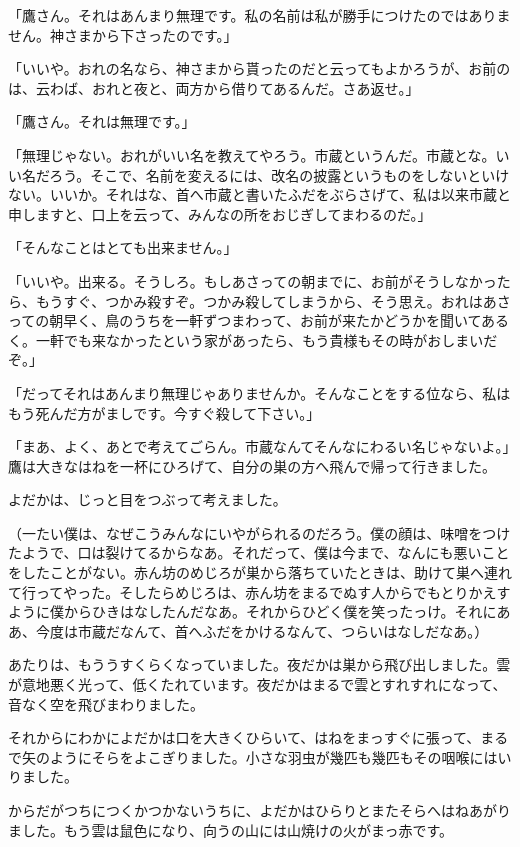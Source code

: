 \documentclass[a4paper, platex, dvipdfmx]{jsarticle}
\begin{document}
「鷹さん。それはあんまり無理です。私の名前は私が勝手につけたのではありません。神さまから下さったのです。」

「いいや。おれの名なら、神さまから貰ったのだと云ってもよかろうが、お前のは、云わば、おれと夜と、両方から借りてあるんだ。さあ返せ。」

「鷹さん。それは無理です。」

「無理じゃない。おれがいい名を教えてやろう。市蔵というんだ。市蔵とな。いい名だろう。そこで、名前を変えるには、改名の披露というものをしないといけない。いいか。それはな、首へ市蔵と書いたふだをぶらさげて、私は以来市蔵と申しますと、口上を云って、みんなの所をおじぎしてまわるのだ。」

「そんなことはとても出来ません。」

「いいや。出来る。そうしろ。もしあさっての朝までに、お前がそうしなかったら、もうすぐ、つかみ殺すぞ。つかみ殺してしまうから、そう思え。おれはあさっての朝早く、鳥のうちを一軒ずつまわって、お前が来たかどうかを聞いてあるく。一軒でも来なかったという家があったら、もう貴様もその時がおしまいだぞ。」

「だってそれはあんまり無理じゃありませんか。そんなことをする位なら、私はもう死んだ方がましです。今すぐ殺して下さい。」

「まあ、よく、あとで考えてごらん。市蔵なんてそんなにわるい名じゃないよ。」鷹は大きなはねを一杯にひろげて、自分の巣の方へ飛んで帰って行きました。

よだかは、じっと目をつぶって考えました。

（一たい僕は、なぜこうみんなにいやがられるのだろう。僕の顔は、味噌をつけたようで、口は裂けてるからなあ。それだって、僕は今まで、なんにも悪いことをしたことがない。赤ん坊のめじろが巣から落ちていたときは、助けて巣へ連れて行ってやった。そしたらめじろは、赤ん坊をまるでぬす人からでもとりかえすように僕からひきはなしたんだなあ。それからひどく僕を笑ったっけ。それにああ、今度は市蔵だなんて、首へふだをかけるなんて、つらいはなしだなあ。）

あたりは、もううすくらくなっていました。夜だかは巣から飛び出しました。雲が意地悪く光って、低くたれています。夜だかはまるで雲とすれすれになって、音なく空を飛びまわりました。

それからにわかによだかは口を大きくひらいて、はねをまっすぐに張って、まるで矢のようにそらをよこぎりました。小さな羽虫が幾匹も幾匹もその咽喉にはいりました。

からだがつちにつくかつかないうちに、よだかはひらりとまたそらへはねあがりました。もう雲は鼠色になり、向うの山には山焼けの火がまっ赤です。
\end{document}

